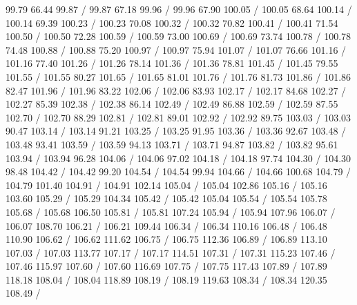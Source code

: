 { 99.79 66.44 99.87 /
 99.87 67.18 99.96 /
 99.96 67.90 100.05 /
 100.05 68.64 100.14 /
 100.14 69.39 100.23 /
 100.23 70.08 100.32 /
 100.32 70.82 100.41 /
 100.41 71.54 100.50 /
 100.50 72.28 100.59 /
 100.59 73.00 100.69 /
 100.69 73.74 100.78 /
 100.78 74.48 100.88 /
 100.88 75.20 100.97 /
 100.97 75.94 101.07 /
 101.07 76.66 101.16 /
 101.16 77.40 101.26 /
 101.26 78.14 101.36 /
 101.36 78.81 101.45 /
 101.45 79.55 101.55 /
 101.55 80.27 101.65 /
 101.65 81.01 101.76 /
 101.76 81.73 101.86 /
 101.86 82.47 101.96 /
 101.96 83.22 102.06 /
 102.06 83.93 102.17 /
 102.17 84.68 102.27 /
 102.27 85.39 102.38 /
 102.38 86.14 102.49 /
 102.49 86.88 102.59 /
 102.59 87.55 102.70 /
 102.70 88.29 102.81 /
 102.81 89.01 102.92 /
 102.92 89.75 103.03 /
 103.03 90.47 103.14 /
 103.14 91.21 103.25 /
 103.25 91.95 103.36 /
 103.36 92.67 103.48 /
 103.48 93.41 103.59 /
 103.59 94.13 103.71 /
 103.71 94.87 103.82 /
 103.82 95.61 103.94 /
 103.94 96.28 104.06 /
 104.06 97.02 104.18 /
 104.18 97.74 104.30 /
 104.30 98.48 104.42 /
 104.42 99.20 104.54 /
 104.54 99.94 104.66 /
 104.66 100.68 104.79 /
 104.79 101.40 104.91 /
 104.91 102.14 105.04 /
 105.04 102.86 105.16 /
 105.16 103.60 105.29 /
 105.29 104.34 105.42 /
 105.42 105.04 105.54 /
 105.54 105.78 105.68 /
 105.68 106.50 105.81 /
 105.81 107.24 105.94 /
 105.94 107.96 106.07 /
 106.07 108.70 106.21 /
 106.21 109.44 106.34 /
 106.34 110.16 106.48 /
 106.48 110.90 106.62 /
 106.62 111.62 106.75 /
 106.75 112.36 106.89 /
 106.89 113.10 107.03 /
 107.03 113.77 107.17 /
 107.17 114.51 107.31 /
 107.31 115.23 107.46 /
 107.46 115.97 107.60 /
 107.60 116.69 107.75 /
 107.75 117.43 107.89 /
 107.89 118.18 108.04 /
 108.04 118.89 108.19 /
 108.19 119.63 108.34 /
 108.34 120.35 108.49 /
}
